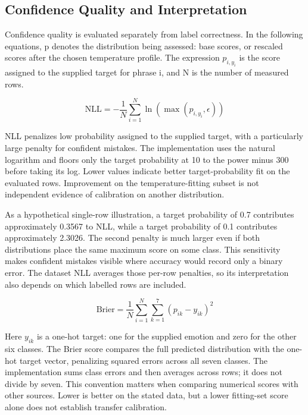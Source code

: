 \documentclass[journal]{IEEEtran}
\begin{document}
\subsection{Confidence Quality and Interpretation}

Confidence quality is evaluated separately from label correctness. In the following equations, p denotes the distribution being assessed: base scores, or rescaled scores after the chosen temperature profile. The expression \(p_{i,y_i}\) is the score assigned to the supplied target for phrase i, and N is the number of measured rows.

\begin{equation}
\mathrm{NLL}=-\frac{1}{N}\sum_{i=1}^{N}\ln\!\left(\max(p_{i,y_i},\epsilon)\right)
\label{eq:nll}
\end{equation}

NLL penalizes low probability assigned to the supplied target, with a particularly large penalty for confident mistakes. The implementation uses the natural logarithm and floors only the target probability at 10 to the power minus 300 before taking its log. Lower values indicate better target-probability fit on the evaluated rows. Improvement on the temperature-fitting subset is not independent evidence of calibration on another distribution.

As a hypothetical single-row illustration, a target probability of 0.7 contributes approximately 0.3567 to NLL, while a target probability of 0.1 contributes approximately 2.3026. The second penalty is much larger even if both distributions place the same maximum score on some class. This sensitivity makes confident mistakes visible where accuracy would record only a binary error. The dataset NLL averages those per-row penalties, so its interpretation also depends on which labelled rows are included.

\begin{equation}
\mathrm{Brier}=\frac{1}{N}\sum_{i=1}^{N}\sum_{k=1}^{7}(p_{ik}-y_{ik})^2
\label{eq:brier}
\end{equation}

Here \(y_{ik}\) is a one-hot target: one for the supplied emotion and zero for the other six classes. The Brier score compares the full predicted distribution with the one-hot target vector, penalizing squared errors across all seven classes. The implementation sums class errors and then averages across rows; it does not divide by seven. This convention matters when comparing numerical scores with other sources. Lower is better on the stated data, but a lower fitting-set score alone does not establish transfer calibration.
\end{document}
